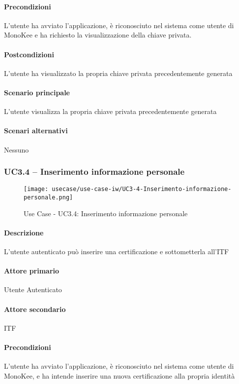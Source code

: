 \paragraph{Precondizioni}  L’utente ha avviato l’applicazione, è riconosciuto nel sistema come utente di MonoKee e ha richiesto la visualizzazione della chiave privata.
\paragraph{Postcondizioni}  L’utente ha visualizzato la propria chiave privata precedentemente generata
\paragraph{Scenario principale}  
L’utente visualizza la propria chiave privata precedentemente generata
\paragraph{Scenari alternativi}  Nessuno



\subsubsection{UC3.4 – Inserimento informazione personale}
\begin{figure}[!htbp] 
    \centering 
    \texttt{[image: usecase/use-case-iw/UC3-4-Inserimento-informazione-personale.png]} 
    \caption{Use Case - UC3.4: Inserimento informazione personale}
\end{figure}

\paragraph{Descrizione}  L’utente autenticato può inserire una certificazione e sottometterla all’ITF
\paragraph{Attore primario}  Utente Autenticato
\paragraph{Attore secondario}  ITF
\paragraph{Precondizioni}  L’utente ha avviato l’applicazione, è riconosciuto nel sistema come utente di MonoKee, e ha intende inserire una nuova certificazione alla propria identità
